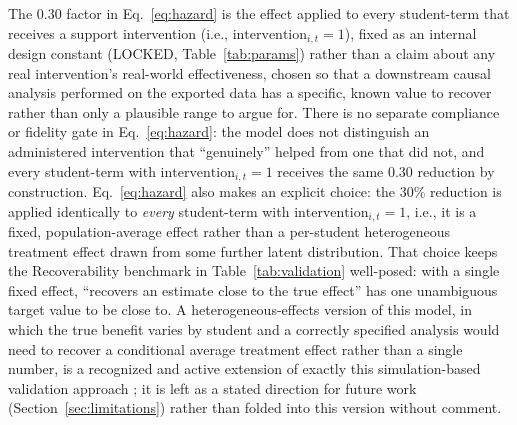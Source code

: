 \documentclass[11pt]{article}
\begin{document}
The $0.30$ factor in Eq.~\ref{eq:hazard} is the effect applied to every student-term that receives a support intervention (i.e., $\text{intervention}_{i,t}=1$), fixed as an internal design constant (LOCKED, Table~\ref{tab:params}) rather than a claim about any real intervention's real-world effectiveness, chosen so that a downstream causal analysis performed on the exported data has a specific, known value to recover rather than only a plausible range to argue for. There is no separate compliance or fidelity gate in Eq.~\ref{eq:hazard}: the model does not distinguish an administered intervention that ``genuinely'' helped from one that did not, and every student-term with $\text{intervention}_{i,t}=1$ receives the same $0.30$ reduction by construction. Eq.~\ref{eq:hazard} also makes an explicit choice: the 30\% reduction is applied identically to \emph{every} student-term with $\text{intervention}_{i,t}=1$, i.e., it is a fixed, population-average effect rather than a per-student heterogeneous treatment effect drawn from some further latent distribution. That choice keeps the Recoverability benchmark in Table~\ref{tab:validation} well-posed: with a single fixed effect, ``recovers an estimate close to the true effect'' has one unambiguous target value to be close to. A heterogeneous-effects version of this model, in which the true benefit varies by student and a correctly specified analysis would need to recover a conditional average treatment effect rather than a single number, is a recognized and active extension of exactly this simulation-based validation approach \citep{smith2020global}; it is left as a stated direction for future work (Section~\ref{sec:limitations}) rather than folded into this version without comment.
\end{document}
